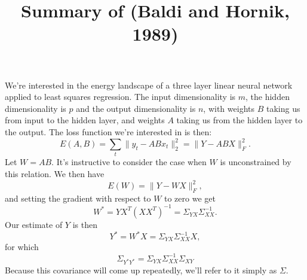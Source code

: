 \documentclass[11pt]{article}
\title{Summary of (Baldi and Hornik, 1989)}
\date{}
\begin{document}
\maketitle
We're interested in the energy landscape of a three layer linear neural network applied to least squares regression. The input dimensionality is $m$, the hidden dimensionality is $p$ and the output dimensionality is $n$, with weights $B$ taking us from input to the hidden layer, and weights $A$ taking us from the hidden layer to the output. The loss function we're interested in is then:
$$ E(A,B) = \sum_t \|y_t - ABx_t\|_2^2 = \|Y - ABX\|_F^2.$$
Let $W = AB$. It's instructive to consider the case when $W$ is unconstrained by this relation. We then have
$$ E(W) = \|Y - W X\|_F^2,$$
and setting the gradient with respect to $W$ to zero we get
$$ W^* = YX^T (XX^T)^{-1} = \Sigma_{YX} \Sigma_{XX}^{-1}.$$
Our estimate of $Y$ is then
$$ Y^* = W^* X = \Sigma_{YX} \Sigma_{XX}^{-1} X,$$
for which
$$ \Sigma_{Y^*Y^*} = \Sigma_{YX} \Sigma_{XX}^{-1} \Sigma_{XY}$$
Because this covariance will come up repeatedly, we'll refer to it simply as $\Sigma$.
\end{document}
